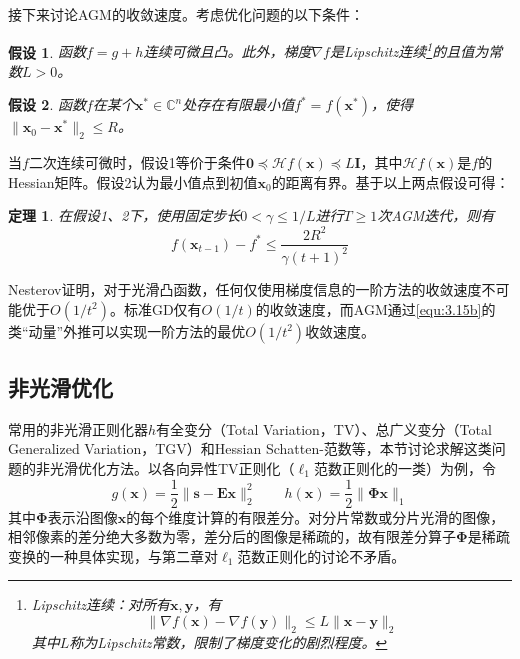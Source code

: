 \documentclass[12pt]{article}
\newtheorem{theorem}{定理}
\newtheorem{hypothesis}{假设}
\begin{document}
接下来讨论AGM的收敛速度。考虑优化问题的以下条件：
\begin{hypothesis}
    函数$f=g+h$连续可微且凸。此外，梯度$\nabla f$是Lipschitz连续\footnote{Lipschitz连续：对所有$\bm{x},\bm{y}$，有
    \begin{equation}
        \|\nabla f(\bm{x})-\nabla f(\bm{y})\|_2\leq L\|\bm{x}-\bm{y}\|_2
    \end{equation}
    其中$L$称为Lipschitz常数，限制了梯度变化的剧烈程度。}的且值为常数$L>0$。
\end{hypothesis}
\begin{hypothesis}
    函数$f$在某个$\bm{x}^*\in\mathbb{C}^n$处存在有限最小值$f^*=f(\bm{x}^*)$，使得$\|\bm{x}_0-\bm{x}^*\|_2\leq R$。
\end{hypothesis}
当$f$二次连续可微时，假设1等价于条件$\bm{0}\preceq\mathcal{H}f(\bm{x})\preceq L\mathbf{I}$，其中$\mathcal{H}f(\bm{x})$是$f$的Hessian矩阵。假设2认为最小值点到初值$\bm{x}_0$的距离有界。基于以上两点假设可得：
\begin{theorem}
    在假设1、2下，使用固定步长$0<\gamma\leq 1/L$进行$T\ge 1$次AGM迭代，则有
    \begin{equation}
        f(\bm{x}_{t-1})-f^*\leq\frac{2R^2}{\gamma(t+1)^2}
        \label{equ:3.17}
    \end{equation}
\end{theorem}
Nesterov证明，对于光滑凸函数，任何仅使用梯度信息的一阶方法的收敛速度不可能优于$O(1/t^2)$。标准GD仅有$O(1/t)$的收敛速度，而AGM通过\autoref{equ:3.15b}的类“动量”外推可以实现一阶方法的最优$O(1/t^2)$收敛速度。

\subsection{非光滑优化}\label{chap:3.2}
常用的非光滑正则化器$h$有全变分（Total Variation，TV）\label{term:TV}、总广义变分（Total Generalized Variation，TGV）\label{term:TGV}和Hessian Schatten-范数等，本节讨论求解这类问题的非光滑优化方法。以各向异性TV正则化（$\ell_1$范数正则化的一类）为例，令
\begin{equation}
    g(\bm{x})=\frac{1}{2}\|\bm{s}-\mathbf{E}\bm{x}\|_2^2\qquad h(\bm{x})=\frac{1}{2}\|\bm{\Phi}\bm{x}\|_1
    \label{equ:3.18}
\end{equation}
其中$\bm{\Phi}$表示沿图像$\bm{x}$的每个维度计算的有限差分。对分片常数或分片光滑的图像，相邻像素的差分绝大多数为零，差分后的图像是稀疏的，故有限差分算子$\bm{\Phi}$是稀疏变换的一种具体实现，与第二章对$\ell_1$范数正则化的讨论不矛盾。
\end{document}

